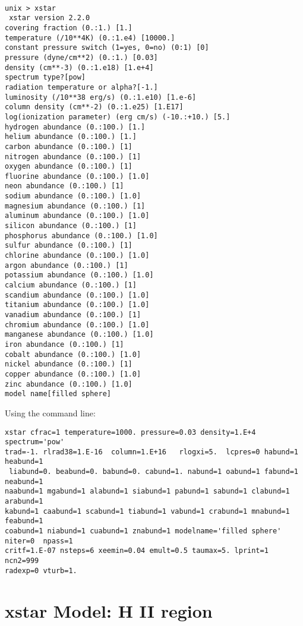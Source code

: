 \begin{verbatim}

unix > xstar
 xstar version 2.2.0
covering fraction (0.:1.) [1.] 
temperature (/10**4K) (0.:1.e4) [10000.] 
constant pressure switch (1=yes, 0=no) (0:1) [0] 
pressure (dyne/cm**2) (0.:1.) [0.03] 
density (cm**-3) (0.:1.e18) [1.e+4] 
spectrum type?[pow] 
radiation temperature or alpha?[-1.] 
luminosity (/10**38 erg/s) (0.:1.e10) [1.e-6] 
column density (cm**-2) (0.:1.e25) [1.E17] 
log(ionization parameter) (erg cm/s) (-10.:+10.) [5.] 
hydrogen abundance (0.:100.) [1.] 
helium abundance (0.:100.) [1.] 
carbon abundance (0.:100.) [1] 
nitrogen abundance (0.:100.) [1] 
oxygen abundance (0.:100.) [1] 
fluorine abundance (0.:100.) [1.0] 
neon abundance (0.:100.) [1] 
sodium abundance (0.:100.) [1.0] 
magnesium abundance (0.:100.) [1] 
aluminum abundance (0.:100.) [1.0] 
silicon abundance (0.:100.) [1] 
phosphorus abundance (0.:100.) [1.0] 
sulfur abundance (0.:100.) [1] 
chlorine abundance (0.:100.) [1.0] 
argon abundance (0.:100.) [1] 
potassium abundance (0.:100.) [1.0] 
calcium abundance (0.:100.) [1] 
scandium abundance (0.:100.) [1.0] 
titanium abundance (0.:100.) [1.0] 
vanadium abundance (0.:100.) [1] 
chromium abundance (0.:100.) [1.0] 
manganese abundance (0.:100.) [1.0] 
iron abundance (0.:100.) [1] 
cobalt abundance (0.:100.) [1.0] 
nickel abundance (0.:100.) [1] 
copper abundance (0.:100.) [1.0] 
zinc abundance (0.:100.) [1.0] 
model name[filled sphere] 

\end{verbatim}

Using the command line:


\begin{verbatim}
xstar cfrac=1 temperature=1000. pressure=0.03 density=1.E+4 spectrum='pow' 
trad=-1. rlrad38=1.E-16  column=1.E+16   rlogxi=5.  lcpres=0 habund=1 heabund=1 
 liabund=0. beabund=0. babund=0. cabund=1. nabund=1 oabund=1 fabund=1 neabund=1 
naabund=1 mgabund=1 alabund=1 siabund=1 pabund=1 sabund=1 clabund=1 arabund=1 
kabund=1 caabund=1 scabund=1 tiabund=1 vabund=1 crabund=1 mnabund=1 feabund=1 
coabund=1 niabund=1 cuabund=1 znabund=1 modelname='filled sphere' niter=0  npass=1 
critf=1.E-07 nsteps=6 xeemin=0.04 emult=0.5 taumax=5. lprint=1  ncn2=999 
radexp=0 vturb=1.
\end{verbatim}

\section{xstar Model: H II region}

